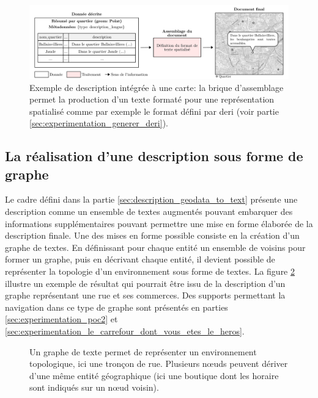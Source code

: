 \begin{figure}[ht]
    \centering
    \includegraphics[width=\textwidth]{images/description/exemple_desc_spatialise.pdf
    }
    \caption[Exemple de description spatialisée.]{Exemple de description intégrée à une carte: la brique d'assemblage permet la production d'un texte formaté pour une représentation spatialisé comme par exemple le format défini par \gls{deri} (voir partie \ref{sec:experimentation_generer_deri}).}
    \label{fig:desc_ex_desc_spatialisee}
\end{figure}

\subsection{La réalisation d'une description sous forme de graphe}

\label{sec:description_graphe}

Le cadre défini dans la partie \ref{sec:description_geodata_to_text} présente une description comme un ensemble de textes augmentés pouvant embarquer des informations supplémentaires pouvant permettre une mise en forme élaborée de la description finale. Une des mises en forme possible consiste en la création d'un graphe de textes. En définissant pour chaque entité un ensemble de voisins pour former un graphe, puis en décrivant chaque entité, il devient possible de représenter la topologie d'un environnement sous forme de textes. La figure \ref{fig:desc_graphe_texte} illustre un exemple de résultat qui pourrait être issu de la description d'un graphe représentant une rue et ses commerces. Des supports permettant la navigation dans ce type de graphe sont présentés en parties \ref{sec:experimentation_poc2} et \ref{sec:experimentation_le_carrefour_dont_vous_etes_le_heros}.

\begin{figure}[ht]
    \centering
    \caption[Graphe de texte d'un tronçon de rue]{Un graphe de texte permet de représenter un environnement topologique, ici une tronçon de rue. Plusieurs nœuds peuvent dériver d'une même entité géographique (ici une boutique dont les horaire sont indiqués sur un nœud voisin).}
    \label{fig:desc_graphe_texte}
\end{figure}

